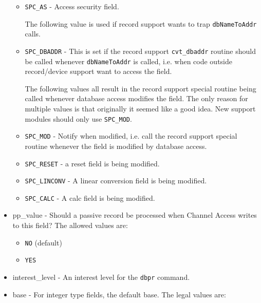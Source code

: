 \begin{itemize}
\begin{itemize}
\item {}\verb|SPC_AS| - Access security field.


The following value is used if record support wants to trap \verb|dbNameToAddr| calls.

\item \verb|SPC_DBADDR| - This is set if the record support \verb|cvt_dbaddr| routine should be called whenever 
\verb|dbNameToAddr| is called, i.e. when code outside record/device support want to access the field.


The following values all result in the record support special routine being called whenever database access 
modifies the field. The only reason for multiple values is that originally it seemed like a good idea. New 
support modules should only use \verb|SPC_MOD|.

\item \verb|SPC_MOD| - Notify when modified, i.e. call the record support special routine whenever the field is modified 
by database access.

\item {}\verb|SPC_RESET| - a reset field is being modified.

\item {}\verb|SPC_LINCONV| - A linear conversion field is being modified.

\item {}\verb|SPC_CALC| - A calc field is being modified.

\end{itemize}

\item {}pp\_value - Should a passive record be processed when Channel Access writes to this field?  The allowed values 
are:

\begin{itemize}
\item \verb|NO| (default)
\item \verb|YES|
\end{itemize}

\item {}interest\_level - An interest level for the \verb|dbpr| command.

\item {}base - For integer type fields, the default base. The legal values are:


\end{itemize}
